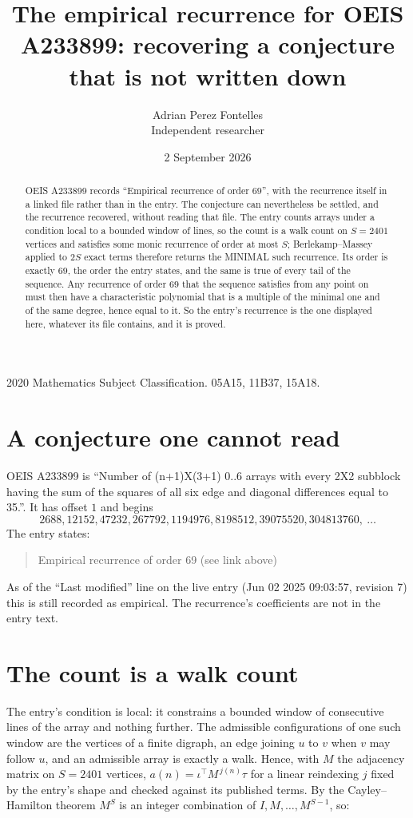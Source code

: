 \documentclass[11pt,a4paper]{article}
\title{The empirical recurrence for OEIS A233899: recovering a conjecture that is not written down}
\author{Adrian Perez Fontelles\\ \small Independent researcher}
\date{2 September 2026}
\theoremstyle{plain}
\theoremstyle{definition}
\begin{document}
\maketitle

\begin{abstract}
OEIS A233899 records ``Empirical recurrence of order $69$'', with the recurrence itself in a
linked file rather than in the entry. The conjecture can nevertheless be settled, and the
recurrence recovered, without reading that file. The entry counts arrays under a condition
local to a bounded window of lines, so the count is a walk count on $S=2401$ vertices and
satisfies some monic recurrence of order at most $S$; Berlekamp--Massey applied to $2S$ exact
terms therefore returns the MINIMAL such recurrence. Its order is exactly $69$, the order
the entry states, and the same is true of every tail of the sequence. Any recurrence of order
$69$ that the sequence satisfies from any point on must then have a characteristic
polynomial that is a multiple of the minimal one and of the same degree, hence equal to it. So
the entry's recurrence is the one displayed here, whatever its file contains, and it is
proved.
\end{abstract}

\noindent\small 2020 Mathematics Subject Classification. 05A15, 11B37, 15A18.\normalsize

\section{A conjecture one cannot read}

OEIS A233899 is ``Number of (n+1)X(3+1) 0..6 arrays with every 2X2 subblock having the sum of the squares of all six edge and diagonal differences equal to 35.''. It has offset $1$ and begins
\[
2688, 12152, 47232, 267792, 1194976, 8198512, 39075520, 304813760,\ \dots
\]
The entry states:
\begin{quote}
Empirical recurrence of order 69 (see link above)
\end{quote}
As of the ``Last modified'' line on the live entry (Jun 02 2025 09:03:57, revision 7) this is still
recorded as empirical. The recurrence's coefficients are not in the entry text.

\section{The count is a walk count}

The entry's condition is local: it constrains a bounded window of consecutive lines of the
array and nothing further. The admissible configurations of one such window are the vertices
of a finite digraph, an edge joining $u$ to $v$ when $v$ may follow $u$, and an admissible
array is exactly a walk. Hence, with $M$ the adjacency matrix on $S=2401$ vertices,
$a(n)=\iota^{\!\top}M^{\,j(n)}\tau$ for a linear reindexing $j$ fixed by the entry's shape
and checked against its published terms. By the Cayley--Hamilton theorem $M^{S}$ is an
integer combination of $I,M,\dots,M^{S-1}$, so:
\end{document}
